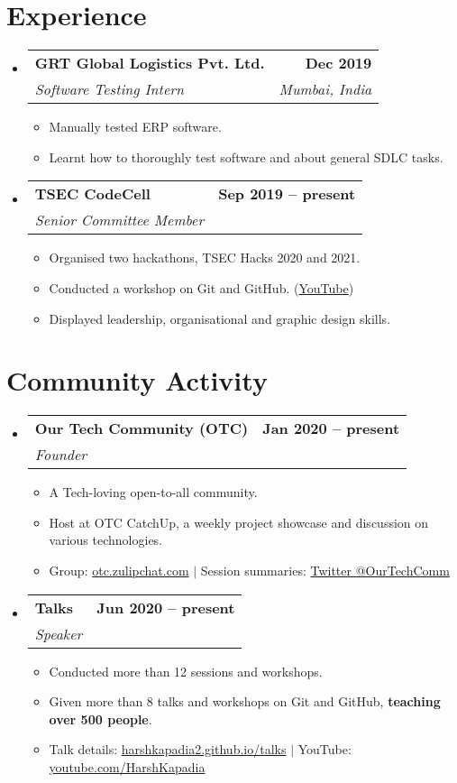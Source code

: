 \documentclass[letterpaper,11pt]{article}
\makeatletter
\newcommand{\resumeItem}[1]{
  \item\small{
    {#1 \vspace{-2pt}}
  }
}
\newcommand{\resumeSubheading}[4]{
  \vspace{-2pt}\item
    \begin{tabular*}{1.0\textwidth}[t]{l@{\extracolsep{\fill}}r}
      \textbf{#1} & \textbf{\small #2} \\
      \textit{\small#3} & \textit{\small #4} \\
    \end{tabular*}\vspace{-7pt}
}
\newcommand{\resumeSubHeadingListStart}{\begin{itemize}[leftmargin=0.0in, label={}]}
\newcommand{\resumeSubHeadingListEnd}{\end{itemize}}
\newcommand{\resumeItemListStart}{\begin{itemize}}
\newcommand{\resumeItemListEnd}{\end{itemize}\vspace{-5pt}}
\makeatother
\begin{document}
\section{Experience}
    \resumeSubHeadingListStart
        \resumeSubheading
            {GRT Global Logistics Pvt. Ltd.}{Dec 2019}
            {Software Testing Intern}{Mumbai, India}
            \resumeItemListStart
                \resumeItem{Manually tested ERP software.}
                \resumeItem{Learnt how to thoroughly test software and about general SDLC tasks.}
            \resumeItemListEnd

        \resumeSubheading
            {TSEC CodeCell}{Sep 2019 -- present}
            {Senior Committee Member}{}
            \resumeItemListStart
                \resumeItem{Organised two hackathons, TSEC Hacks 2020 and 2021.}
                \resumeItem{Conducted a workshop on Git and GitHub. (\href{https://www.youtube.com/watch?v=ArOKEf8nkfw}{YouTube})}
                \resumeItem{Displayed leadership, organisational and graphic design skills.}
            \resumeItemListEnd
    \resumeSubHeadingListEnd
\vspace{-16pt}


\section{Community Activity}
    \resumeSubHeadingListStart
        \resumeSubheading
            {Our Tech Community (OTC)}{Jan 2020 -- present}
            {Founder}{}
            \resumeItemListStart
                \resumeItem{A Tech-loving open-to-all community.}
                \resumeItem{Host at OTC CatchUp, a weekly project showcase and discussion on various technologies.}
                \resumeItem{Group: \href{https://otc.zulipchat.com/}{otc.zulipchat.com} $|$ Session summaries: \href{https://twitter.com/OurTechComm}{Twitter @OurTechComm}}
            \resumeItemListEnd
    
        \resumeSubheading
            {Talks}{Jun 2020 -- present}
            {Speaker}{}
            \resumeItemListStart
                \resumeItem{Conducted more than 12 sessions and workshops.}
                \resumeItem{Given more than 8 talks and workshops on Git and GitHub, \textbf{teaching over 500 people}.}
                \resumeItem{Talk details: \href{https://harshkapadia2.github.io/talks/}{harshkapadia2.github.io/talks} $|$ YouTube: \href{https://www.youtube.com/HarshKapadia}{youtube.com/HarshKapadia}}
            \resumeItemListEnd
    \resumeSubHeadingListEnd


\end{document}
